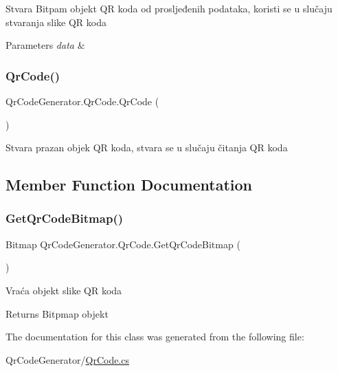 Stvara Bitpam objekt QR koda od prosljeđenih podataka, koristi se u slučaju stvaranja slike QR koda 


\begin{DoxyParams}{Parameters}
{\em data} & \\
\hline
\end{DoxyParams}
\mbox{\label{class_qr_code_generator_1_1_qr_code_a344ec2624de42c98084a987ac5747134}} 
\subsubsection{\texorpdfstring{Qr\+Code()}{QrCode()}\hspace{0.1cm}{\footnotesize\ttfamily [2/2]}}
{\footnotesize\ttfamily Qr\+Code\+Generator.\+Qr\+Code.\+Qr\+Code (\begin{DoxyParamCaption}{ }\end{DoxyParamCaption})}



Stvara prazan objek QR koda, stvara se u slučaju čitanja QR koda 



\subsection{Member Function Documentation}
\mbox{\label{class_qr_code_generator_1_1_qr_code_afcb7ea41edae80596a5ba5d857fa3e32}} 
\subsubsection{\texorpdfstring{Get\+Qr\+Code\+Bitmap()}{GetQrCodeBitmap()}}
{\footnotesize\ttfamily Bitmap Qr\+Code\+Generator.\+Qr\+Code.\+Get\+Qr\+Code\+Bitmap (\begin{DoxyParamCaption}{ }\end{DoxyParamCaption})}



Vraća objekt slike QR koda 

\begin{DoxyReturn}{Returns}
Bitpmap objekt
\end{DoxyReturn}


The documentation for this class was generated from the following file\+:\begin{DoxyCompactItemize}
\item 
Qr\+Code\+Generator/\mbox{\hyperlink{_qr_code_8cs}{Qr\+Code.\+cs}}\end{DoxyCompactItemize}
